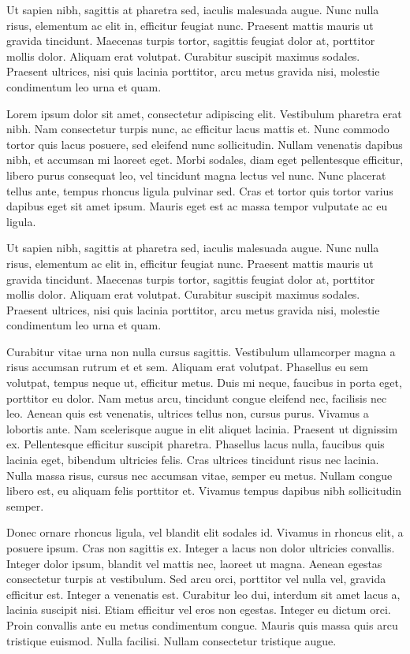 \documentclass[a4paper]{memoir}
\begin{document}
Ut sapien nibh, sagittis at pharetra sed, iaculis malesuada augue. Nunc nulla risus, elementum ac elit in, efficitur feugiat nunc. Praesent mattis mauris ut gravida tincidunt. Maecenas turpis tortor, sagittis feugiat dolor at, porttitor mollis dolor. Aliquam erat volutpat. Curabitur suscipit maximus sodales. Praesent ultrices, nisi quis lacinia porttitor, arcu metus gravida nisi, molestie condimentum leo urna et quam. 

Lorem ipsum dolor sit amet, consectetur adipiscing elit. Vestibulum pharetra erat nibh. Nam consectetur turpis nunc, ac efficitur lacus mattis et. Nunc commodo tortor quis lacus posuere, sed eleifend nunc sollicitudin. Nullam venenatis dapibus nibh, et accumsan mi laoreet eget. Morbi sodales, diam eget pellentesque efficitur, libero purus consequat leo, vel tincidunt magna lectus vel nunc. Nunc placerat tellus ante, tempus rhoncus ligula pulvinar sed. Cras et tortor quis tortor varius dapibus eget sit amet ipsum. Mauris eget est ac massa tempor vulputate ac eu ligula. 

Ut sapien nibh, sagittis at pharetra sed, iaculis malesuada augue. Nunc nulla risus, elementum ac elit in, efficitur feugiat nunc. Praesent mattis mauris ut gravida tincidunt. Maecenas turpis tortor, sagittis feugiat dolor at, porttitor mollis dolor. Aliquam erat volutpat. Curabitur suscipit maximus sodales. Praesent ultrices, nisi quis lacinia porttitor, arcu metus gravida nisi, molestie condimentum leo urna et quam. 

Curabitur vitae urna non nulla cursus sagittis. Vestibulum ullamcorper magna a risus accumsan rutrum et et sem. Aliquam erat volutpat. Phasellus eu sem volutpat, tempus neque ut, efficitur metus. Duis mi neque, faucibus in porta eget, porttitor eu dolor. Nam metus arcu, tincidunt congue eleifend nec, facilisis nec leo. Aenean quis est venenatis, ultrices tellus non, cursus purus. Vivamus a lobortis ante. Nam scelerisque augue in elit aliquet lacinia. Praesent ut dignissim ex. Pellentesque efficitur suscipit pharetra. Phasellus lacus nulla, faucibus quis lacinia eget, bibendum ultricies felis. Cras ultrices tincidunt risus nec lacinia. Nulla massa risus, cursus nec accumsan vitae, semper eu metus. Nullam congue libero est, eu aliquam felis porttitor et. Vivamus tempus dapibus nibh sollicitudin semper. 

Donec ornare rhoncus ligula, vel blandit elit sodales id. Vivamus in rhoncus elit, a posuere ipsum. Cras non sagittis ex. Integer a lacus non dolor ultricies convallis. Integer dolor ipsum, blandit vel mattis nec, laoreet ut magna. Aenean egestas consectetur turpis at vestibulum. Sed arcu orci, porttitor vel nulla vel, gravida efficitur est. Integer a venenatis est. Curabitur leo dui, interdum sit amet lacus a, lacinia suscipit nisi. Etiam efficitur vel eros non egestas. Integer eu dictum orci. Proin convallis ante eu metus condimentum congue. Mauris quis massa quis arcu tristique euismod. Nulla facilisi. Nullam consectetur tristique augue. 
\end{document}

